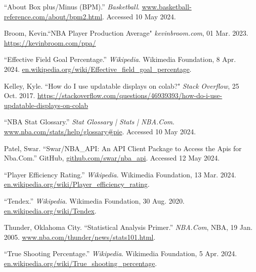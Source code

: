 \documentclass{article}
\begin{document}
\begingroup
\renewcommand{\section}[2]{}%
\begin{thebibliography}{9}

``About Box plus/Minus (BPM).'' \textit{Basketball}. \url{www.basketball-reference.com/about/bpm2.html}. Accessed 10 May 2024.

Broom, Kevin.``NBA Player Production Average" \textit{kevinbroom.com}, 01 Mar. 2023. \url{https://kevinbroom.com/ppa/}

``Effective Field Goal Percentage.'' \textit{Wikipedia}. Wikimedia Foundation, 8 Apr. 2024. \url{en.wikipedia.org/wiki/Effective_field_goal_percentage}.

Kelley, Kyle. ``How do I use updatable displays on colab?" \textit{Stack Overflow}, 25 Oct. 2017. \url{https://stackoverflow.com/questions/46939393/how-do-i-use-updatable-displays-on-colab}

``NBA Stat Glossary.'' \textit{Stat Glossary | Stats | NBA.Com}. \url{www.nba.com/stats/help/glossary#pie}. Accessed 10 May 2024.

Patel, Swar. “Swar/NBA_API: An API Client Package to Access the Apis for Nba.Com.” GitHub, \url{github.com/swar/nba_api}. Accessed 12 May 2024.

``Player Efficiency Rating.'' \textit{Wikipedia}. Wikimedia Foundation, 13 Mar. 2024. \url{en.wikipedia.org/wiki/Player_efficiency_rating}.

``Tendex.'' \textit{Wikipedia}. Wikimedia Foundation, 30 Aug. 2020. \url{en.wikipedia.org/wiki/Tendex}.

Thunder, Oklahoma City. ``Statistical Analysis Primer.'' \textit{NBA.Com}, NBA, 19 Jan. 2005. \url{www.nba.com/thunder/news/stats101.html}.

``True Shooting Percentage.'' \textit{Wikipedia}. Wikimedia Foundation, 5 Apr. 2024. \url{en.wikipedia.org/wiki/True_shooting_percentage}.

\end{thebibliography}
\end{document}
